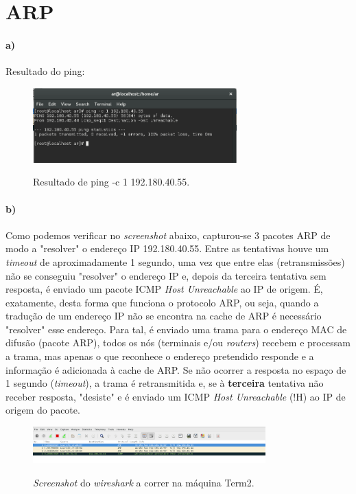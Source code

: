 \section{ARP}
\paragraph{a)}
Resultado do ping:
\begin{figure}[h]
\centering
\includegraphics[width=0.7\textwidth]{2_a_screenshot.png}
\label{fig:ping}
\caption{Resultado de \textsf{ping -c 1 192.180.40.55}.}
\end{figure}

\paragraph{b)}
Como podemos verificar no \emph{screenshot} abaixo, capturou-se 3 pacotes ARP de modo a "resolver" o endereço IP 192.180.40.55. Entre as tentativas houve um \emph{timeout} de aproximadamente 1 segundo, uma vez que entre elas (retransmissões) não se conseguiu "resolver" o endereço IP e, depois da terceira tentativa sem resposta, é enviado um pacote ICMP \emph{Host Unreachable} ao IP de origem.
É, exatamente, desta forma que funciona o protocolo ARP, ou seja, quando a tradução de um endereço IP não se encontra na cache de ARP é necessário "resolver" esse endereço. Para tal, é enviado uma trama para o endereço MAC de difusão (pacote ARP), todos os nós (terminais e/ou \emph{routers}) recebem e processam a trama, mas apenas o que reconhece o endereço pretendido responde e a informação é adicionada à cache de ARP. Se não ocorrer a resposta no espaço de 1 segundo (\emph{timeout}), a trama é retransmitida e, se à \textbf{terceira} tentativa não receber resposta, "desiste" e é enviado um ICMP \emph{Host Unreachable} (!H) ao IP de origem do pacote.

\begin{figure}[h]
\centering
\includegraphics[width=0.8\textwidth, height=0.13\textheight]{2_a__screenshot.png}
\label{fig:wireshark}
\caption{\emph{Screenshot} do \emph{wireshark} a correr na máquina \textsf{Term2}.}
\end{figure}